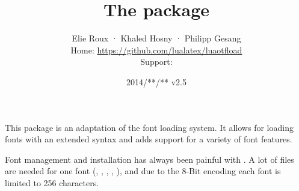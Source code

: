 
\title{The  package}
\date{2014/**/** v2.5}
\author{Elie Roux · Khaled Hosny · Philipp Gesang\\
			 Home:      \url   {https://github.com/lualatex/luaotfload}\\
			 Support:   }

\maketitle

\beginabstractcontent
	This package is an adaptation of the \CONTEXT font loading system.
	It allows for loading \OpenType fonts with an extended syntax and adds
	support for a variety of font features.
\endabstractcontent


\tableofcontents


Font management and installation has always been painful with \TEX.  A
lot of files are needed for one font (, ,
, , ), and due to the 8-Bit encoding
each font is limited to 256 characters.

